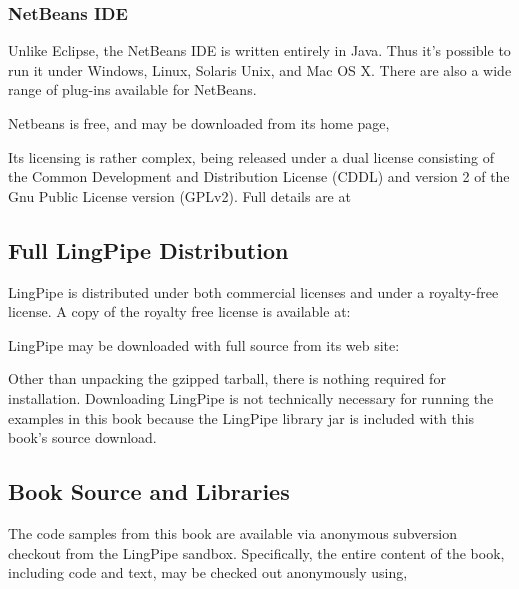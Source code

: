 \subsubsection{NetBeans IDE}

Unlike Eclipse, the NetBeans IDE is written entirely in Java.  Thus
it's possible to run it under Windows, Linux, Solaris Unix, and Mac OS
X. There are also a wide range of plug-ins available for NetBeans.

Netbeans is free, and may be downloaded from its home page,
%
\begin{quote}
\end{quote}
%
Its licensing is rather complex, being released under a dual license
consisting of the Common Development and Distribution License (CDDL)
and version 2 of the Gnu Public License version (GPLv2).  Full details
are at
%
\begin{quote}
\end{quote}


\subsection{Full LingPipe Distribution}

LingPipe is distributed under both commercial licenses
and under a royalty-free license.  A copy of the royalty free
license is available at:
%
\begin{quote}
\end{quote}

LingPipe may be downloaded with full source from its web site:
%
\begin{quote}
\end{quote}
%
Other than unpacking the gzipped tarball, there is nothing required
for installation.  Downloading LingPipe is not technically necessary for
running the examples in this book because the LingPipe library jar is
included with this book's source download.


\subsection{Book Source and Libraries}

The code samples from this book are available via anonymous subversion checkout
from the LingPipe sandbox.  Specifically, the entire content of the book,
including code and text, may be checked out anonymously using,


